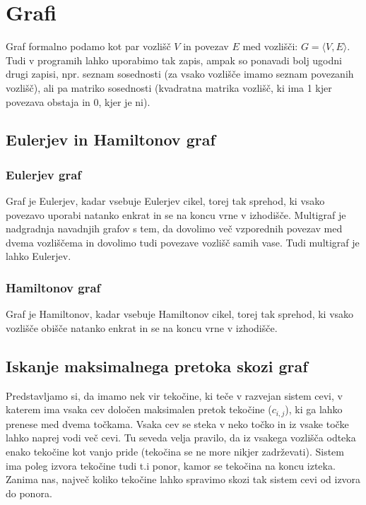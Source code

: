 \documentclass[10pt,a4paper,oneside]{book}
\begin{document}
\chapter{Grafi}
Graf formalno podamo kot par vozlišč $V$ in povezav $E$ med vozlišči: $G=\langle V, E \rangle$. Tudi v programih lahko uporabimo tak zapis, ampak so ponavadi bolj ugodni drugi zapisi, npr. seznam sosednosti (za vsako vozlišče imamo seznam povezanih vozlišč), ali pa matriko sosednosti (kvadratna matrika vozlišč, ki ima 1 kjer povezava obstaja in 0, kjer je ni).

\section{Eulerjev in Hamiltonov graf}
\subsection{Eulerjev graf}
Graf je Eulerjev, kadar vsebuje Eulerjev cikel, torej tak sprehod, ki vsako povezavo uporabi natanko enkrat in se na koncu vrne v izhodišče. Multigraf je nadgradnja navadnjih grafov s tem, da dovolimo več vzporednih povezav med dvema vozliščema in dovolimo tudi povezave vozlišč samih vase. Tudi multigraf je lahko Eulerjev.

\subsection{Hamiltonov graf}
Graf je Hamiltonov, kadar vsebuje Hamiltonov cikel, torej tak sprehod, ki vsako vozlišče obišče natanko enkrat in se na koncu vrne v izhodišče.

\section{Iskanje maksimalnega pretoka skozi graf}
Predstavljamo si, da imamo nek vir tekočine, ki teče v razvejan sistem cevi, v katerem ima vsaka cev določen maksimalen pretok tekočine ($c_{i,j}$), ki ga lahko prenese med dvema točkama. Vsaka cev se steka v neko točko in iz vsake točke lahko naprej vodi več cevi. Tu seveda velja pravilo, da iz vsakega vozlišča odteka enako tekočine kot vanjo pride (tekočina se ne more nikjer zadrževati). Sistem ima poleg izvora tekočine tudi t.i ponor, kamor se tekočina na koncu izteka. Zanima nas, največ koliko tekočine lahko spravimo skozi tak sistem cevi od izvora do ponora.\\
\end{document}
